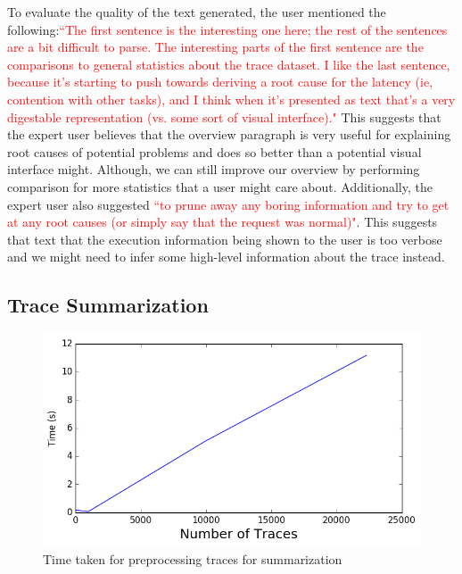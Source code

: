  To evaluate the quality of the text generated, the user mentioned the following:\textcolor{red}{``The first sentence is the interesting one here; the rest of the sentences are a bit difficult to parse.
The interesting parts of the first sentence are the comparisons to general statistics about the trace dataset.  I like the last sentence, because it's starting to push towards deriving a 
root cause for the latency (ie, contention with other tasks), and I think when it's presented as text that's a very digestable representation (vs. some sort of visual interface)."}
This suggests that the expert user believes that the overview paragraph is very useful for explaining root causes of potential problems and does so better than a potential
visual interface might. Although, we can still improve our overview by performing comparison for more statistics that a user might care about. Additionally,
the expert user also suggested \textcolor{red}{``to prune away any boring information and try to get at any root causes (or simply say that the request was normal)"}. This suggests
that text that the execution information being shown to the user is too verbose and we might need to infer some high-level information about the trace instead.

\subsection{Trace Summarization}

\begin{figure}
    \centering
    \includegraphics[width=\linewidth]{fig/preprocessing}
    \caption{Time taken for preprocessing traces for summarization}
    \label{fig:preprocessing}
\end{figure}

